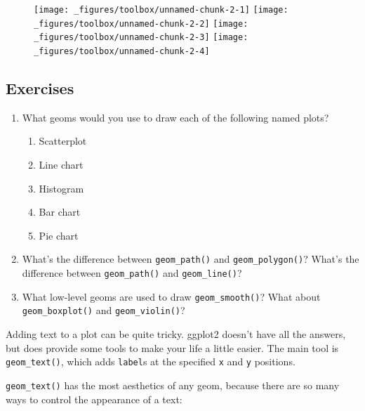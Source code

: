 \begin{figure}[H]
  \texttt{[image: \_figures/toolbox/unnamed-chunk-2-1]}%
  \texttt{[image: \_figures/toolbox/unnamed-chunk-2-2]}%
  \texttt{[image: \_figures/toolbox/unnamed-chunk-2-3]}%
  \texttt{[image: \_figures/toolbox/unnamed-chunk-2-4]}
\end{figure}

\subsection{Exercises}

\begin{enumerate}
\def\labelenumi{\arabic{enumi}.}
\item
  What geoms would you use to draw each of the following named plots?

  \begin{enumerate}
  \def\labelenumii{\arabic{enumii}.}
  \tightlist
  \item
    Scatterplot
  \item
    Line chart
  \item
    Histogram
  \item
    Bar chart
  \item
    Pie chart
  \end{enumerate}
\item
  What's the difference between \texttt{geom\_path()} and
  \texttt{geom\_polygon()}? What's the difference between
  \texttt{geom\_path()} and \texttt{geom\_line()}?
\item
  What low-level geoms are used to draw \texttt{geom\_smooth()}? What
  about \texttt{geom\_boxplot()} and \texttt{geom\_violin()}?
\end{enumerate}


  

Adding text to a plot can be quite tricky. ggplot2 doesn't have all the
answers, but does provide some tools to make your life a little easier.
The main tool is \texttt{geom\_text()}, which adds \texttt{label}s at
the specified \texttt{x} and \texttt{y} positions.

\texttt{geom\_text()} has the most aesthetics of any geom, because there
are so many ways to control the appearance of a text:

